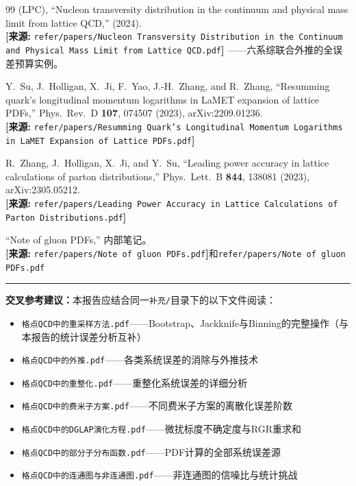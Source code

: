 \documentclass[12pt,a4paper]{ctexart}
\begin{document}
\begin{thebibliography}{99}
(LPC),
``Nucleon transversity distribution in the continuum and physical mass limit from lattice QCD,''
(2024).
\\\textbf{[来源:} \texttt{refer/papers/Nucleon Transversity Distribution in the Continuum and Physical Mass Limit from Lattice QCD.pdf}\textbf{]}
——六系综联合外推的全误差预算实例。

Y.~Su, J.~Holligan, X.~Ji, F.~Yao, J.-H.~Zhang, and R.~Zhang,
``Resumming quark's longitudinal momentum logarithms in LaMET expansion of lattice PDFs,''
Phys.\ Rev.\ D \textbf{107}, 074507 (2023), arXiv:2209.01236.
\\\textbf{[来源:} \texttt{refer/papers/Resumming Quark's Longitudinal Momentum Logarithms in LaMET Expansion of Lattice PDFs.pdf}\textbf{]}

R.~Zhang, J.~Holligan, X.~Ji, and Y.~Su,
``Leading power accuracy in lattice calculations of parton distributions,''
Phys.\ Lett.\ B \textbf{844}, 138081 (2023), arXiv:2305.05212.
\\\textbf{[来源:} \texttt{refer/papers/Leading Power Accuracy in Lattice Calculations of Parton Distributions.pdf}\textbf{]}

``Note of gluon PDFs,'' 内部笔记。
\\\textbf{[来源:} \texttt{refer/papers/Note of gluon PDFs.pdf}\textbf{]}和\texttt{refer/papers/Note of gluon PDFs.pdf}

\end{thebibliography}

\vspace{0.5cm}
\noindent\rule{\textwidth}{0.5pt}
\small
\textbf{交叉参考建议：}本报告应结合同一\texttt{补充/}目录下的以下文件阅读：
\begin{itemize}[nosep]
    \item \texttt{格点QCD中的重采样方法.pdf}——Bootstrap、Jackknife与Binning的完整操作（与本报告的统计误差分析互补）
    \item \texttt{格点QCD中的外推.pdf}——各类系统误差的消除与外推技术
    \item \texttt{格点QCD中的重整化.pdf}——重整化系统误差的详细分析
    \item \texttt{格点QCD中的费米子方案.pdf}——不同费米子方案的离散化误差阶数
    \item \texttt{格点QCD中的DGLAP演化方程.pdf}——微扰标度不确定度与RGR重求和
    \item \texttt{格点QCD中的部分子分布函数.pdf}——PDF计算的全部系统误差源
    \item \texttt{格点QCD中的连通图与非连通图.pdf}——非连通图的信噪比与统计挑战
\end{itemize}
\end{document}
